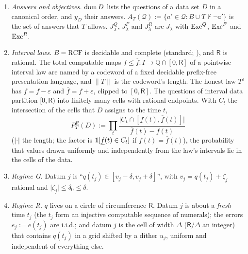 \begin{definition}\label{def:laws:settingfull}
\leavevmode
\begin{enumerate}[label=(\alph*),itemsep=1pt,topsep=2pt]
\item \emph{Answers and objectives.} $\operatorname{dom} D$ lists the questions of a data set $D$ in a canonical order, and $y_D$ their answers. $A_T(\mathcal Q):=\{a'\in\mathcal Q:B\cup T\nvdash\neg a'\}$ is the set of answers that $T$ allows. $J^Q_\lambda$, $J^F_\lambda$ and $J^R_\lambda$ are $J_\lambda$ with $\mathrm{Exc}^Q$, $\mathrm{Exc}^F$ and $\mathrm{Exc}^R$.
\item \emph{Interval laws.} $B=\mathrm{RCF}$ is decidable and complete (standard; \citealp{tarski1951decision}), and $\mathsf R$ is rational. The total computable maps $\underline f\le\overline f:I\to\mathbb Q\cap[0,\mathsf R]$ of a pointwise interval law are named by a codeword of a fixed decidable prefix-free presentation language, and $\lVert T\rVert$ is the codeword's length. The honest law $T^\varepsilon$ has $\underline f=f-\varepsilon$ and $\overline f=f+\varepsilon$, clipped to $[0,\mathsf R]$. The questions of interval data partition $[0,\mathsf R)$ into finitely many cells with rational endpoints. With $C_t$ the intersection of the cells that $D$ assigns to the time $t$,
\[P^R_T(D):=\prod_t\frac{\lvert C_t\cap[\underline f(t),\overline f(t)]\rvert}{\overline f(t)-\underline f(t)}\]
($\lvert\cdot\rvert$ the length; the factor is $\mathbf{1}[\underline f(t)\in C_t]$ if $\underline f(t)=\overline f(t)$), the probability that values drawn uniformly and independently from the law's intervals lie in the cells of the data.
\item \emph{Regime G.} Datum $j$ is ``$q(t_j)\in[v_j-\delta,v_j+\delta]$'', with $v_j=q(t_j)+\zeta_j$ rational and $\lvert\zeta_j\rvert\le\delta_0\le\delta$.
\item \emph{Regime R.} $q$ lives on a circle of circumference $\mathsf R$. Datum $j$ is about a \emph{fresh} time $t_j$ (the $t_j$ form an injective computable sequence of numerals); the errors $e_j:=e(t_j)$ are i.i.d.; and datum $j$ is the cell of width $\Delta$ ($\mathsf R/\Delta$ an integer) that contains $q(t_j)$ in a grid shifted by a dither $u_j$, uniform and independent of everything else.
\end{enumerate}
\end{definition}

